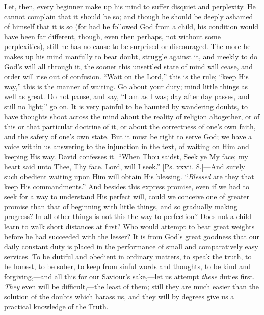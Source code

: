 Let, then, every beginner make up his mind to suffer
disquiet and perplexity. He cannot complain that it
should be so; and though he should be deeply ashamed of
himself that it is so (for had he followed God from a
child, his condition would have been far different,
though, even then perhaps, not without some
perplexities), still he has no cause to be surprised or
discouraged. The more he makes up his mind manfully to
bear doubt, struggle against it, and meekly to do God's
will all through it, the sooner this unsettled state of
mind will cease, and order will rise out of confusion.
``Wait on the Lord,'' this is the rule;
``keep His way,'' this is the manner of waiting.
Go about your duty; mind little things as well as great.
Do not pause, and say, ``I am as I was; day after day
passes, and still no light;'' go on. It is very
painful to be haunted by wandering doubts, to have
thoughts shoot across the mind about the reality of
religion altogether, or of this or that particular
doctrine of it, or about the correctness of one's own
faith, and the safety of one's own state. But it must be
right to serve God; we have a voice within us answering
to the injunction in the text, of waiting on Him and
keeping His way. David confesses it. ``When Thou
saidst, Seek ye My face; my heart said unto Thee, Thy
face, Lord, will I seek.'' [Ps. xxvii. 8.]—And
surely such obedient waiting upon Him will obtain His
blessing. ``\emph{Blessed} are they that keep His
commandments.'' And besides this express promise,
even if we had to seek for a way to understand His
perfect will, could we conceive one of greater promise
than that of beginning with little things, and so
gradually making progress? In all other things is not
this the way to perfection? Does not a child learn to
walk short distances at first? Who would attempt to bear
great weights before he had succeeded with the lesser? It
is from God's great goodness that our daily constant duty
is placed in the performance of small and comparatively
easy services. To be dutiful and obedient in ordinary
matters, to speak the truth, to be honest, to be sober,
to keep from sinful words and thoughts, to be kind and
forgiving,—and all this for our Saviour's
sake,—let us attempt \emph{these} duties first. \emph{They}
even will be difficult,—the least of them; still
they are much easier than the solution of the doubts
which harass us, and they will by degrees give us a
practical knowledge of the Truth.

